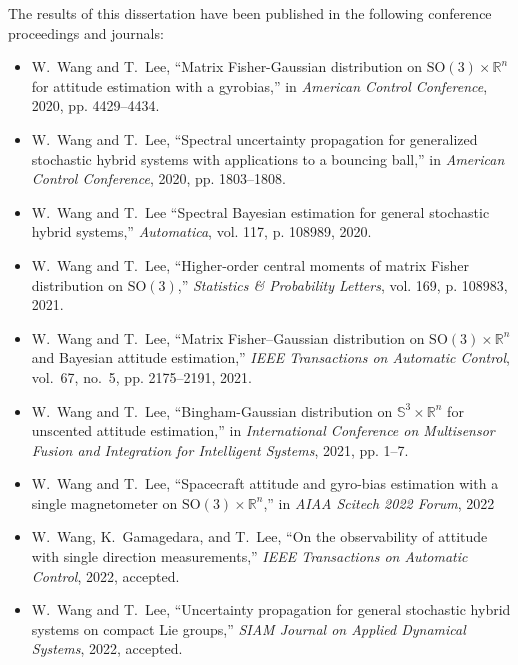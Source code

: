 The results of this dissertation have been published in the following conference proceedings and journals:
\begin{itemize}
	\item W.~Wang and T.~Lee, ``Matrix {F}isher-{G}aussian distribution on $\mathrm{SO}(3)\times\mathbb{R}^n$ for attitude estimation with a gyrobias,'' in \emph{American Control Conference}, 2020, pp. 4429--4434.~\cite{wang2020matrix}
	\item W.~Wang and T.~Lee, ``Spectral uncertainty propagation for generalized stochastic hybrid systems with applications to a bouncing ball,'' in \emph{American Control Conference}, 2020, pp. 1803--1808.~\cite{wang2020spectral}
	\item W.~Wang and T.~Lee ``Spectral {B}ayesian estimation for general stochastic hybrid systems,'' \emph{Automatica}, vol. 117, p. 108989, 2020.~\cite{wang2020spectral-b}
	\item W.~Wang and T.~Lee, ``Higher-order central moments of matrix {F}isher distribution on
	$\mathrm{SO}(3)$,'' \emph{Statistics \& Probability Letters}, vol. 169, p.
	108983, 2021.~\cite{wang2021higher}
	\item W.~Wang and T.~Lee, ``Matrix {F}isher--{G}aussian distribution on
	$\mathrm{SO}(3)\times\mathbb{R}^n$ and {B}ayesian attitude estimation,''
	\emph{IEEE Transactions on Automatic Control}, vol.~67, no.~5, pp.
	2175--2191, 2021.~\cite{wang2021matrix}
	\item W.~Wang and T.~Lee, ``Bingham-{G}aussian distribution on $\mathbb{S}^3\times\mathbb{R}^n$ for unscented attitude estimation,'' in \emph{International Conference on Multisensor Fusion and Integration for Intelligent Systems}, 2021, pp. 1--7.~\cite{wang2021bingham}
	\item W.~Wang and T.~Lee, ``Spacecraft attitude and gyro-bias estimation with a single magnetometer on $\mathrm{SO}(3)\times\mathbb{R}^n$,'' in \emph{AIAA Scitech 2022 Forum}, 2022~\cite{wang2022spacecraft}
	\item W.~Wang, K.~Gamagedara, and T.~Lee, ``On the observability of attitude with single direction measurements,'' \emph{IEEE Transactions on Automatic Control}, 2022, accepted.~\cite{wang2022observability}
	\item W.~Wang and T.~Lee, ``Uncertainty propagation for general stochastic hybrid systems on compact {L}ie groups,'' \emph{SIAM Journal on Applied Dynamical Systems}, 2022, accepted.~\cite{wang2022uncertainty}
\end{itemize}

